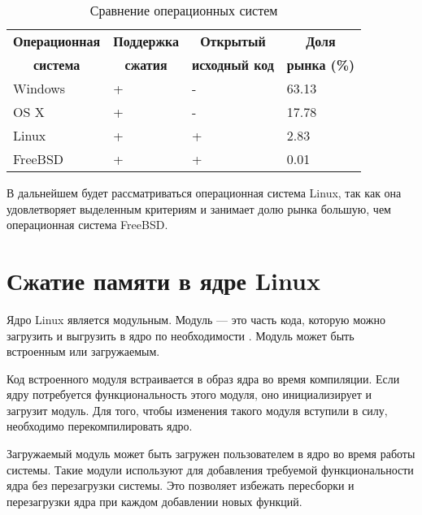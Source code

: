 \begin{table}[h]
    \caption{Сравнение операционных систем}
    \begin{center}
        \begin{tabular}{|l|l|l|l|}
        		\hline
            \multicolumn{1}{|c}{\textbf{Операционная}} & 
            \multicolumn{1}{|c|}{\textbf{Поддержка}} &
            \multicolumn{1}{c|}{\textbf{Открытый}} &
            \multicolumn{1}{c|}{\textbf{Доля}} \\
            \multicolumn{1}{|c}{\textbf{система}} & 
            \multicolumn{1}{|c|}{\textbf{сжатия}} &
            \multicolumn{1}{c|}{\textbf{исходный код}} &
            \multicolumn{1}{c|}{\textbf{рынка (\%)}} \\ \hline
            Windows &  + & - & 63.13 \\ \hline
            OS X & + & - & 17.78 \\ \hline
            Linux & + & + & 2.83 \\ \hline
            FreeBSD & + & + & 0.01 \\ \hline
        \end{tabular}
    \end{center}
    \label{tab:comparison-os}
\end{table}

В дальнейшем будет рассматриваться операционная система Linux, так как она удовлетворяет выделенным критериям и занимает долю рынка большую, чем операционная система FreeBSD.

\section{Сжатие памяти в ядре Linux}

Ядро Linux является модульным. Модуль --- это часть кода, которую можно загрузить и выгрузить в ядро по необходимости \cite{module}. Модуль может быть встроенным или загружаемым.

Код встроенного модуля встраивается в образ ядра во время компиляции. Если ядру потребуется функциональность этого модуля, оно инициализирует и загрузит модуль. Для того, чтобы изменения такого модуля вступили в силу, необходимо перекомпилировать ядро.

Загружаемый модуль может быть загружен пользователем в ядро во время работы системы. Такие модули используют для добавления требуемой функциональности ядра без перезагрузки системы. Это позволяет избежать пересборки и перезагрузки ядра при каждом добавлении новых функций. 

